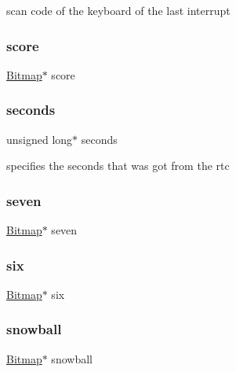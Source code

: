 scan code of the keyboard of the last interrupt 

\mbox{\label{struct_game_a7e8b45f8df315cb4a376278b7fb19637}} 
\subsubsection{\texorpdfstring{score}{score}}
{\footnotesize\ttfamily \hyperlink{struct_bitmap}{Bitmap}$\ast$ score}

\mbox{\label{struct_game_a8cd7bab31a211893fd0eced50c2937ad}} 
\subsubsection{\texorpdfstring{seconds}{seconds}}
{\footnotesize\ttfamily unsigned long$\ast$ seconds}



specifies the seconds that was got from the rtc 

\mbox{\label{struct_game_a836a58a5a90d466c88faaf715390255b}} 
\subsubsection{\texorpdfstring{seven}{seven}}
{\footnotesize\ttfamily \hyperlink{struct_bitmap}{Bitmap}$\ast$ seven}

\mbox{\label{struct_game_a05ab9b8a2dde183189fd7e9244eadca7}} 
\subsubsection{\texorpdfstring{six}{six}}
{\footnotesize\ttfamily \hyperlink{struct_bitmap}{Bitmap}$\ast$ six}

\mbox{\label{struct_game_a0863074f198120542c675bd18f611557}} 
\subsubsection{\texorpdfstring{snowball}{snowball}}
{\footnotesize\ttfamily \hyperlink{struct_bitmap}{Bitmap}$\ast$ snowball}


